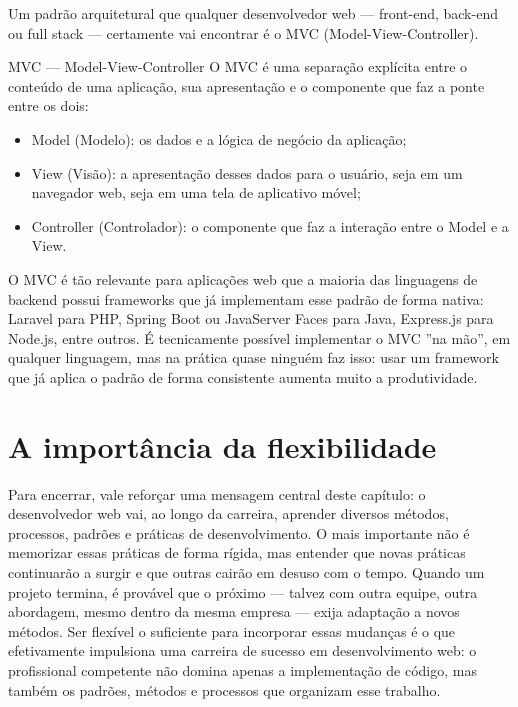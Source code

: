 Um padrão arquitetural que qualquer desenvolvedor web — front-end, back-end ou full stack — certamente vai encontrar é o MVC (Model-View-Controller).

\begin{infobox}{MVC — Model-View-Controller}
O MVC é uma separação explícita entre o conteúdo de uma aplicação, sua apresentação e o componente que faz a ponte entre os dois:
\end{infobox}

\begin{itemize}
  \item Model (Modelo): os dados e a lógica de negócio da aplicação;
\end{itemize}

\begin{itemize}
  \item View (Visão): a apresentação desses dados para o usuário, seja em um navegador web, seja em uma tela de aplicativo móvel;
\end{itemize}

\begin{itemize}
  \item Controller (Controlador): o componente que faz a interação entre o Model e a View.
\end{itemize}

O MVC é tão relevante para aplicações web que a maioria das linguagens de backend possui frameworks que já implementam esse padrão de forma nativa: Laravel para PHP, Spring Boot ou JavaServer Faces para Java, Express.js para Node.js, entre outros. É tecnicamente possível implementar o MVC ”na mão”, em qualquer linguagem, mas na prática quase ninguém faz isso: usar um framework que já aplica o padrão de forma consistente aumenta muito a produtividade.

\section{A importância da flexibilidade}

Para encerrar, vale reforçar uma mensagem central deste capítulo: o desenvolvedor web vai, ao longo da carreira, aprender diversos métodos, processos, padrões e práticas de desenvolvimento. O mais importante não é memorizar essas práticas de forma rígida, mas entender que novas práticas continuarão a surgir e que outras cairão em desuso com o tempo. Quando um projeto termina, é provável que o próximo — talvez com outra equipe, outra abordagem, mesmo dentro da mesma empresa — exija adaptação a novos métodos. Ser flexível o suficiente para incorporar essas mudanças é o que efetivamente impulsiona uma carreira de sucesso em desenvolvimento web: o profissional competente não domina apenas a implementação de código, mas também os padrões, métodos e processos que organizam esse trabalho.


